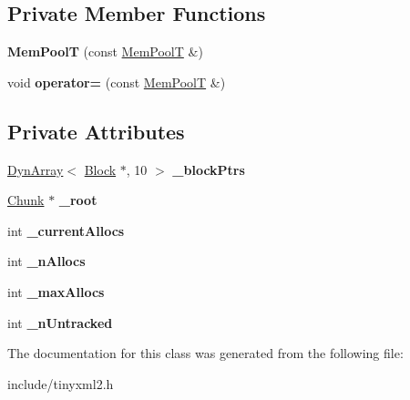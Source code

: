 \subsection*{Private Member Functions}
\begin{DoxyCompactItemize}
\item 
\hypertarget{classtinyxml2_1_1_mem_pool_t_af29791e12c82dacd385dde3695119ee2}{}{\bfseries Mem\+Pool\+T} (const \hyperlink{classtinyxml2_1_1_mem_pool_t}{Mem\+Pool\+T} \&)\label{classtinyxml2_1_1_mem_pool_t_af29791e12c82dacd385dde3695119ee2}

\item 
\hypertarget{classtinyxml2_1_1_mem_pool_t_a5e01b67e42601516f2e6c72b3781d8de}{}void {\bfseries operator=} (const \hyperlink{classtinyxml2_1_1_mem_pool_t}{Mem\+Pool\+T} \&)\label{classtinyxml2_1_1_mem_pool_t_a5e01b67e42601516f2e6c72b3781d8de}

\end{DoxyCompactItemize}
\subsection*{Private Attributes}
\begin{DoxyCompactItemize}
\item 
\hypertarget{classtinyxml2_1_1_mem_pool_t_af8eeecccb8c484c34ba04e3757e081be}{}\hyperlink{classtinyxml2_1_1_dyn_array}{Dyn\+Array}$<$ \hyperlink{structtinyxml2_1_1_mem_pool_t_1_1_block}{Block} $\ast$, 10 $>$ {\bfseries \+\_\+block\+Ptrs}\label{classtinyxml2_1_1_mem_pool_t_af8eeecccb8c484c34ba04e3757e081be}

\item 
\hypertarget{classtinyxml2_1_1_mem_pool_t_af203dc16256d7631fcbedd87864390bb}{}\hyperlink{uniontinyxml2_1_1_mem_pool_t_1_1_chunk}{Chunk} $\ast$ {\bfseries \+\_\+root}\label{classtinyxml2_1_1_mem_pool_t_af203dc16256d7631fcbedd87864390bb}

\item 
\hypertarget{classtinyxml2_1_1_mem_pool_t_ae80f238a4c1fb0b2c037fd62b7bdd0c2}{}int {\bfseries \+\_\+current\+Allocs}\label{classtinyxml2_1_1_mem_pool_t_ae80f238a4c1fb0b2c037fd62b7bdd0c2}

\item 
\hypertarget{classtinyxml2_1_1_mem_pool_t_a1afde0bfad90d20643da123781664d7a}{}int {\bfseries \+\_\+n\+Allocs}\label{classtinyxml2_1_1_mem_pool_t_a1afde0bfad90d20643da123781664d7a}

\item 
\hypertarget{classtinyxml2_1_1_mem_pool_t_ac757df646660b4e8eefaca0d385f97dd}{}int {\bfseries \+\_\+max\+Allocs}\label{classtinyxml2_1_1_mem_pool_t_ac757df646660b4e8eefaca0d385f97dd}

\item 
\hypertarget{classtinyxml2_1_1_mem_pool_t_aca9adac3f7ce44a132dc00c285566b1e}{}int {\bfseries \+\_\+n\+Untracked}\label{classtinyxml2_1_1_mem_pool_t_aca9adac3f7ce44a132dc00c285566b1e}

\end{DoxyCompactItemize}


The documentation for this class was generated from the following file\+:\begin{DoxyCompactItemize}
\item 
include/tinyxml2.\+h\end{DoxyCompactItemize}
